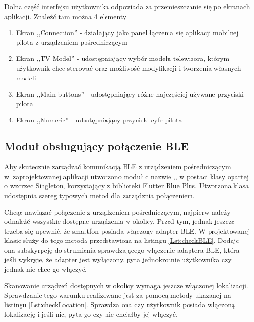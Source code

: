 \documentclass[12pt,twoside]{article}
\begin{document}
Dolna część interfejsu użytkownika odpowiada za przemieszczanie się po ekranach aplikacji. Znaleźć tam można 4 elementy:
\begin{enumerate}[label=\alph*), leftmargin=1.25cm]
   \item Ekran ,,Connection'' - działający jako panel łączenia się aplikacji mobilnej pilota z urządzeniem pośredniczącym
   \item Ekran ,,TV Model'' - udostępniający wybór modelu telewizora, którym użytkownik chce sterować oraz możliwość modyfikacji i tworzenia własnych modeli
   \item Ekran ,,Main buttons'' - udostępniający różne najczęściej używane przyciski pilota
   \item Ekran ,,Numeric'' - udostępniający przyciski cyfr pilota
\end{enumerate}

\subsection{Moduł obsługujący połączenie BLE}
Aby skutecznie zarządzać komunikacją BLE z urządzeniem pośredniczącym w~zaprojektowanej aplikacji utworzono moduł o nazwie ,, w postaci klasy opartej o wzorzec Singleton, korzystający z biblioteki Flutter Blue Plus\cite{flutterBluePlus}. Utworzona klasa udostępnia szereg typowych metod dla zarządznia połączeniem.

Chcąc nawiązać połączenie z urządzeniem pośredniczącym, najpierw należy odnaleźć wszystkie dostępne urządzenia w okolicy. Przed tym, jednak jeszcze trzeba się upewnić, że smartfon posiada włączony adapter BLE. W projektowanej klasie służy do tego metoda  przedstawiona na listingu \ref*{Lst:checkBLE}. Dodaje ona subskyrpcję do strumienia sprawdzającego włączenie adaptera BLE, która jeśli wykryje, że adapter jest wyłączony, pyta jednokrotnie użytkownika czy jednak nie chce go włączyć.

\begin{figure}[!ht]

\end{figure}

Skanowanie urządzeń dostępnych w okolicy wymaga jeszcze włączonej lokalizacji. Sprawdzanie tego warunku realizowane jest za pomocą metody  ukazanej na listingu \ref*{Lst:checkLocation}. Sprawdza ona czy użytkownik posiada włączoną lokalizację i jeśli nie, pyta go czy nie chciałby jej włączyć.
\end{document}
